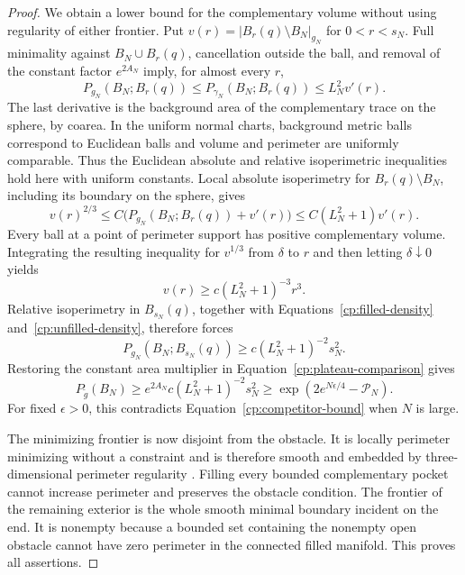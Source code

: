 \begin{proof}
We obtain a lower bound for the complementary volume without using
regularity of either frontier.  Put
$v(r)=|B_r(q)\setminus B_N|_{g_N}$ for $0<r<s_N$.
Full minimality against $B_N\cup B_r(q)$, cancellation outside the
ball, and removal of the constant factor $e^{2A_N}$ imply, for almost
every $r$,
\begin{equation}\label{cp:one-sided-perimeter}
 P_{g_N}(B_N;B_r(q))
 \le P_{\gamma_N}(B_N;B_r(q))
 \le L_N^2v'(r).
\end{equation}
The last derivative is the background area of the complementary
trace on the sphere, by coarea.  In the uniform normal charts,
background metric balls correspond to Euclidean balls and volume
and perimeter are uniformly comparable.  Thus the Euclidean
absolute and relative isoperimetric inequalities
\cite[Theorem~3.46 and Remark~3.50]{AmbrosioFuscoPallara2000}
hold here with uniform constants.  Local absolute isoperimetry for
$B_r(q)\setminus B_N$, including its boundary on the sphere, gives
\[
 v(r)^{2/3}
 \le C\bigl(P_{g_N}(B_N;B_r(q))+v'(r)\bigr)
 \le C(L_N^2+1)v'(r).
\]
Every ball at a point of perimeter support has positive complementary
volume.  Integrating the resulting inequality for $v^{1/3}$ from
$\delta$ to $r$ and then letting $\delta\downarrow0$ yields
\begin{equation}\label{cp:unfilled-density}
 v(r)\ge c(L_N^2+1)^{-3}r^3.
\end{equation}
Relative isoperimetry in $B_{s_N}(q)$, together with
Equations~\eqref{cp:filled-density} and~\eqref{cp:unfilled-density},
therefore forces
\[
 P_{g_N}(B_N;B_{s_N}(q))
       \ge c(L_N^2+1)^{-2}s_N^2.
\]
Restoring the constant area multiplier in
Equation~\eqref{cp:plateau-comparison} gives
\begin{equation}\label{cp:contact-area}
 P_{\widetilde g}(B_N)
 \ge e^{2A_N}c(L_N^2+1)^{-2}s_N^2
 \ge\exp(2e^{N\epsilon/4}-\mathcal P_N).
\end{equation}
For fixed $\epsilon>0$, this contradicts
Equation~\eqref{cp:competitor-bound} when $N$ is large.

The minimizing frontier is now disjoint from the obstacle.  It is
locally perimeter minimizing without a constraint and is therefore
smooth and embedded by three-dimensional perimeter regularity
\cite[Regularity Theorem~1.3(iii)]{HuiskenIlmanen2001}.
Filling every bounded complementary pocket cannot increase perimeter
and preserves the obstacle condition.  The frontier of the remaining
exterior is the whole smooth minimal boundary incident on the end.
It is nonempty because a bounded set containing the nonempty open
obstacle cannot have zero perimeter in the connected filled
manifold.  This proves all assertions.
\end{proof}

